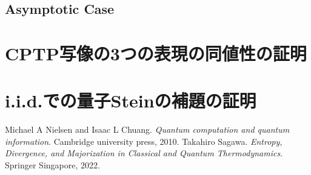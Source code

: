 \documentclass[report]{jlreq}
\begin{document}
\section{Asymptotic Case}

\appendix
\chapter{CPTP写像の3つの表現の同値性の証明}
\chapter{i.i.d.での量子Steinの補題の証明}
  
\begin{thebibliography}{99}
Michael A Nielsen and Isaac L Chuang. 
    \textit{Quantum computation and quantum information}.
    Cambridge university press, 2010.
Takahiro Sagawa. 
    \textit{Entropy, Divergence, and Majorization in Classical and Quantum Thermodynamics}. 
    Springer Singapore, 2022.
\end{thebibliography}
  
\end{document}
